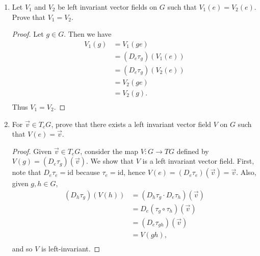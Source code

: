 \documentclass{article}
\begin{document}
\begin{enumerate}[label={\bf Q\arabic*:}]
    \begin{enumerate}
      \item Let $V_1$ and $V_2$ be left invariant vector fields on $G$ such
        that $V_1(e)=V_2(e)$. Prove that $V_1=V_2$.

        \begin{proof}
          Let $g\in G$. Then we have
          \begin{align*}
            V_1(g) &=V_1(ge) \\
              &=(D_e\tau_g)(V_1(e)) \\
              &=(D_e\tau_g)(V_2(e)) \\
              &=V_2(ge) \\
              &=V_2(g). \\
          \end{align*}
          Thus $V_1=V_2$.
        \end{proof}

      \item For $\vec{v}\in T_eG$, prove that there exists a left invariant
        vector field $V$ on $G$ such that $V(e)=\vec{v}$.

        \begin{proof}
          Given $\vec{v}\in T_eG$, consider the map $V:G\rightarrow TG$
          defined by $V(g)=(D_e\tau_g)(\vec{v})$. We show that $V$ is a
          left invariant vector field. First, note that
          $D_e\tau_e=\text{id}$ because $\tau_e=\text{id}$, hence
          $V(e)=(D_e\tau_e)(\vec{v})=\vec{v}$. Also, given $g,h\in G$,
          \begin{align*}
            (D_h\tau_g)(V(h)) &= (D_h\tau_g\cdot D_e\tau_h)(\vec{v}) \\
              &=D_e(\tau_g\circ\tau_h)(\vec{v}) \\
              &=(D_e\tau_{gh})(\vec{v}) \\
              &=V(gh), \\
          \end{align*}
          and so $V$ is left-invariant.
        \end{proof}
    \end{enumerate}
\end{enumerate}
\end{document}

